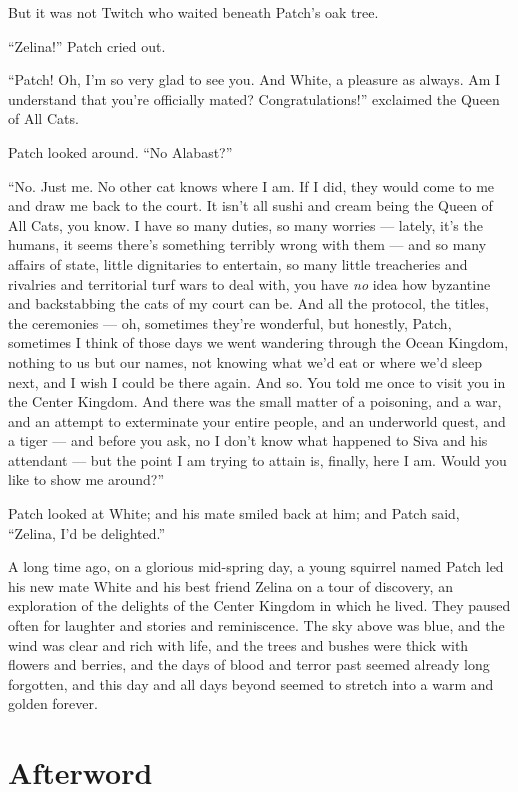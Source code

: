 \documentclass[ebook,oneside,openany,17pt]{memoir}
\newenvironment{tolerant}[1]{%
  \par\tolerance=#1\relax
}{%
  \par
}
\renewcommand{\thechapter}{\Roman{chapter}}
\newcounter{sections}
\newcommand{\sections}[1]{%
  \section*{#1}
  \addtocounter{sections}{1}%
  \pdfbookmark[1]{#1}{section.\thechapter.\thesections}}
\begin{document}
But it was not Twitch who waited beneath Patch’s oak tree.

“Zelina!” Patch cried out.

\begin{tolerant}{2000}
“Patch! Oh, I’m so very glad to see you. And White, a pleasure as
always. Am I understand that you’re officially mated?
Congratulations!” exclaimed the Queen of All Cats.
\end{tolerant}

Patch looked around. “No Alabast?”

“No. Just me. No other cat knows where I am. If I did, they would come
to me and draw me back to the court. It isn’t all sushi and cream
being the Queen of All Cats, you know. I have so many duties, so many
worries — lately, it’s the humans, it seems there’s something terribly
wrong with them — and so many affairs of state, little dignitaries to
entertain, so many little treacheries and rivalries and territorial
turf wars to deal with, you have \emph{no} idea how byzantine and
backstabbing the cats of my court can be. And all the protocol, the
titles, the ceremonies — oh, sometimes they’re wonderful, but
honestly, Patch, sometimes I think of those days we went wandering
through the Ocean Kingdom, nothing to us but our names, not knowing
what we’d eat or where we’d sleep next, and I wish I could be there
again. And so. You told me once to visit you in the Center
Kingdom. And there was the small matter of a poisoning, and a war, and
an attempt to exterminate your entire people, and an underworld quest,
and a tiger — and before you ask, no I don’t know what happened to
Siva and his attendant — but the point I am trying to attain is,
finally, here I am. Would you like to show me around?”

Patch looked at White; and his mate smiled back at him; and Patch
said, “Zelina, I’d be delighted.”

A long time ago, on a glorious mid-spring day, a young squirrel named
Patch led his new mate White and his best friend Zelina on a tour of
discovery, an exploration of the delights of the Center Kingdom in
which he lived. They paused often for laughter and stories and
reminiscence. The sky above was blue, and the wind was clear and rich
with life, and the trees and bushes were thick with flowers and
berries, and the days of blood and terror past seemed already long
forgotten, and this day and all days beyond seemed to stretch into a
warm and golden forever.


\sections{Afterword}
\end{document}
